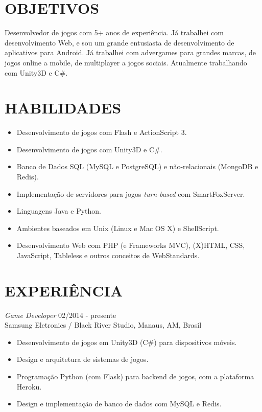 \documentclass[line,margin]{res}
\begin{document}

\address{Rua Dezenove, 63, Cond. Itas, Itapema-303 - Manaus, AM - Brasil}
\address{(11) 99932-6440 - bruno@croci.me - \href{http://bruno.croci.me/}{http://bruno.croci.me/}}

 
\begin{resume}
 
\section{OBJETIVOS} Desenvolvedor de jogos com 5+ anos de experiência. Já trabalhei com desenvolvimento Web, e sou um grande entusiasta de desenvolvimento de aplicativos para Android. Já trabalhei com advergames para grandes marcas, de jogos online a mobile, de multiplayer a jogos sociais. Atualmente trabalhando com Unity3D e C\#.
 
 
\section{HABILIDADES} \begin{itemize}  \itemsep 1.25pt
                 \item Desenvolvimento de jogos com Flash e ActionScript 3.
                 \item Desenvolvimento de jogos com Unity3D e C\#.
                 \item Banco de Dados SQL (MySQL e PostgreSQL) e não-relacionais (MongoDB e Redis).
                 \item Implementação de servidores para jogos {\sl turn-based} com SmartFoxServer.
                 \item Linguagens Java e Python.
                 \item Ambientes baseados em Unix (Linux e Mac OS X) e ShellScript.
                 \item Desenvolvimento Web com PHP (e Frameworks MVC), (X)HTML, CSS, JavaScript, 
                       Tableless e outros conceitos de WebStandards.
                 \end{itemize}
 
\section{EXPERIÊNCIA} {\sl Game Developer} \hfill 02/2014 - presente \\
                Samsung Eletronics / Black River Studio, Manaus, AM, Brasil
                 \begin{itemize}  \itemsep 1.25pt
                 \item Desenvolvimento de jogos em Unity3D (C\#) para dispositivos móveis.
                 \item Design e arquitetura de sistemas de jogos.
        		 \item Programação Python (com Flask) para backend de jogos, com a plataforma Heroku.
                 \item Design e implementação de banco de dados com MySQL e Redis.
                 \end{itemize}


\end{resume}
\end{document}

